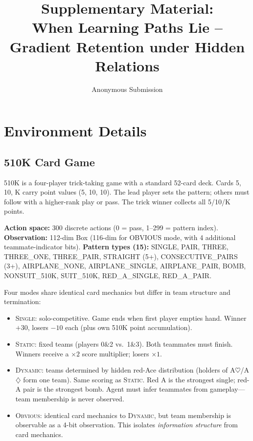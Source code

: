 \documentclass[letterpaper]{article}
\title{Supplementary Material:\\When Learning Paths Lie -- Gradient Retention under Hidden Relations}
\author{Anonymous Submission}
\begin{document}
\maketitle

\section{Environment Details}

\subsection{510K Card Game}

510K is a four-player trick-taking game with a standard 52-card deck.
Cards 5, 10, K carry point values (5, 10, 10).
The lead player sets the pattern; others must follow with a higher-rank play or pass.
The trick winner collects all 5/10/K points.

\medskip
\noindent\textbf{Action space:} 300 discrete actions (0 = pass, 1--299 = pattern index).
\textbf{Observation:} 112-dim Box (116-dim for OBVIOUS mode, with 4 additional teammate-indicator bits).
\textbf{Pattern types (15):} SINGLE, PAIR, THREE, THREE\_ONE, THREE\_PAIR, STRAIGHT (5+), CONSECUTIVE\_PAIRS (3+), AIRPLANE\_NONE, AIRPLANE\_SINGLE, AIRPLANE\_PAIR, BOMB, NONSUIT\_510K, SUIT\_510K, RED\_A\_SINGLE, RED\_A\_PAIR.

\medskip
\noindent Four modes share identical card mechanics but differ in team structure and termination:

\begin{itemize}
\item \textsc{Single}: solo-competitive. Game ends when first player empties hand.
  Winner $+30$, losers $-10$ each (plus own 510K point accumulation).
\item \textsc{Static}: fixed teams (players 0\&2 vs.\ 1\&3). Both teammates must finish.
  Winners receive a $\times 2$ score multiplier; losers $\times 1$.
\item \textsc{Dynamic}: teams determined by hidden red-Ace distribution (holders of
  A$\heartsuit$/A$\diamondsuit$ form one team). Same scoring as \textsc{Static}.
  Red A is the strongest single; red-A pair is the strongest bomb.
  Agent must infer teammates from gameplay---team membership is never observed.
\item \textsc{Obvious}: identical card mechanics to \textsc{Dynamic}, but team membership
  is observable as a 4-bit observation. This isolates \textit{information structure}
  from card mechanics.
\end{itemize}
\end{document}
